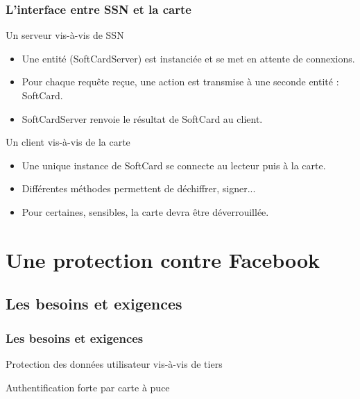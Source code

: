 \documentclass{beamer}
\begin{document}
\begin{frame}
    \frametitle{L'interface entre SSN et la carte}
    \begin{block}{Un serveur vis-à-vis de SSN}
        \begin{itemize}
            \item Une entité (SoftCardServer) est instanciée et se met en
                attente de connexions.
            \item Pour chaque requête reçue, une action est transmise
                à une seconde entité : SoftCard.
            \item SoftCardServer renvoie le résultat de SoftCard au client.
        \end{itemize}
    \end{block}
    \begin{block}{Un client vis-à-vis de la carte}
        \begin{itemize}
            \item Une unique instance de SoftCard se connecte au lecteur puis à
                la carte.
            \item Différentes méthodes permettent de déchiffrer, signer...
            \item Pour certaines, sensibles, la carte devra être déverrouillée.
        \end{itemize}
    \end{block}
\end{frame}

\section{Une protection contre Facebook}

\subsection{Les besoins et exigences}
\begin{frame}
    \frametitle{Les besoins et exigences}
    \begin{block}{}

        Protection des données utilisateur vis-à-vis de tiers

        Authentification forte par carte à puce 
    \end{block}
\end{frame}
\end{document}
